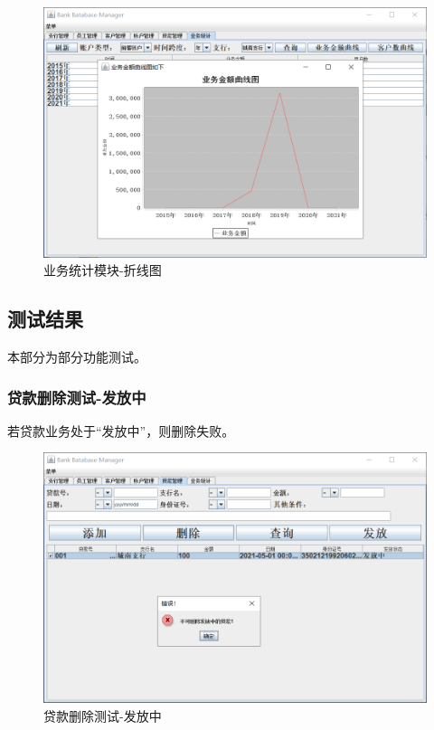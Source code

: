 \documentclass{ctexart}
\begin{document}
\begin{figure}[H]
    \centering
    \includegraphics[scale=0.2]{tj2.png}
    \caption{业务统计模块-折线图}
\end{figure}
\subsection{\hei 测试结果}
本部分为部分功能测试。
\subsubsection{\hei 贷款删除测试-发放中}
若贷款业务处于“发放中”，则删除失败。
\begin{figure}[H]
    \centering
    \includegraphics[scale=0.2]{dk333.png}
    \caption{贷款删除测试-发放中}
\end{figure}
\end{document}
